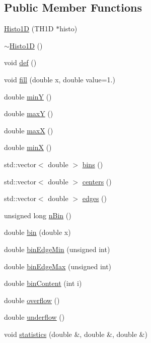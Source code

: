 \subsection*{Public Member Functions}
\begin{DoxyCompactItemize}
\item 
\hyperlink{classHisto1D_aecd55af9b972863d5cee5a387746fb96}{Histo1D} (T\+H1D $\ast$histo)
\item 
\hyperlink{classHisto1D_af62825fd9266c1903d403e489501daa9}{$\sim$\+Histo1D} ()
\item 
void \hyperlink{classHisto1D_a22b820e2c706d8e8614c31962f1ac6d0}{def} ()
\item 
void \hyperlink{classHisto1D_a907707c720f8f0d3f582632d186ee7dd}{fill} (double x, double value=1.)
\item 
double \hyperlink{classHisto1D_a122c7071e060672dd2c08ad92212b3a2}{minY} ()
\item 
double \hyperlink{classHisto1D_a60a1095ac5fbab109d20c54c2ee569a3}{maxY} ()
\item 
double \hyperlink{classHisto1D_a54c7464513d1382c7c66fa880bfe568e}{maxX} ()
\item 
double \hyperlink{classHisto1D_abe9bf76799889414686794502e777b67}{minX} ()
\item 
std\+::vector$<$ double $>$ \hyperlink{classHisto1D_aaa8cd492ee25a3ad1b1694349fb1024c}{bins} ()
\item 
std\+::vector$<$ double $>$ \hyperlink{classHisto1D_a07fd41679a3255cdd44d4dcf8865adb7}{centers} ()
\item 
std\+::vector$<$ double $>$ \hyperlink{classHisto1D_a8c74413d35bce2e244defd470b6b4ebf}{edges} ()
\item 
unsigned long \hyperlink{classHisto1D_a7f3cf7364ae6e1eb9ba08b5ffe897d8f}{n\+Bin} ()
\item 
double \hyperlink{classHisto1D_a2a8a7d93c2f10b73b490a6f550e00db4}{bin} (double x)
\item 
double \hyperlink{classHisto1D_aa15ab79f858358e3cafc0617eb668c2e}{bin\+Edge\+Min} (unsigned int)
\item 
double \hyperlink{classHisto1D_a7923d51b02056dbaef353b70c11499d0}{bin\+Edge\+Max} (unsigned int)
\item 
double \hyperlink{classHisto1D_aece5cb8dddafabe0029067dc3e4be878}{bin\+Content} (int i)
\item 
double \hyperlink{classHisto1D_a5d13018047a4ffb15e662f44a0a3f520}{overflow} ()
\item 
double \hyperlink{classHisto1D_a3bac7a207b9ed5f828001119b2f14869}{underflow} ()
\item 
void \hyperlink{classHisto1D_acc0d6f2080b0cfafc85ebc49cf0efc31}{statistics} (double \&, double \&, double \&)
\end{DoxyCompactItemize}
